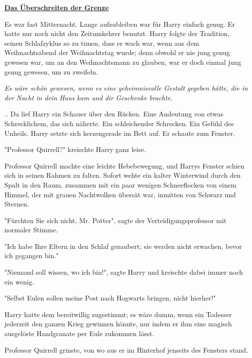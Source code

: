 

\hypertarget{das-uxfcberschreiten-der-grenze}{%

\textbf{\uline{Das Überschreiten der Grenze}}

Es war fast Mitternacht. Lange aufzubleiben war für Harry einfach genug. Er hatte nur noch nicht den Zeitumkehrer benutzt. Harry folgte der Tradition, seinen Schlafzyklus so zu timen, dass er wach war, wenn aus dem Weihnachtsabend der Weihnachtstag wurde; denn obwohl er nie jung genug gewesen war, um an den Weihnachtsmann zu glauben, war er doch einmal jung genug gewesen, um zu zweifeln.

\emph{Es wäre schön gewesen, wenn es eine geheimnisvolle Gestalt gegeben hätte, die in der Nacht in dein Haus kam und dir Geschenke brachte.}

.. Da lief Harry ein Schauer über den Rücken. Eine Andeutung von etwas Schrecklichem, das sich näherte. Ein schleichender Schrecken. Ein Gefühl des Unheils. Harry setzte sich kerzengerade im Bett auf. Er schaute zum Fenster.

"Professor Quirrell?" kreischte Harry ganz leise.

Professor Quirrell machte eine leichte Hebebewegung, und Harrys Fenster schien sich in seinen Rahmen zu falten. Sofort wehte ein kalter Winterwind durch den Spalt in den Raum, zusammen mit ein paar wenigen Schneeflocken von einem Himmel, der mit grauen Nachtwolken übersät war, inmitten von Schwarz und Sternen.

"Fürchten Sie sich nicht, Mr. Potter", sagte der Verteidigungsprofessor mit normaler Stimme.

"Ich habe Ihre Eltern in den Schlaf gezaubert; sie werden nicht erwachen, bevor ich gegangen bin."

"Niemand soll wissen, wo ich bin!", sagte Harry und kreischte dabei immer noch ein wenig.

"Selbst Eulen sollen meine Post nach Hogwarts bringen, nicht hierher!"

Harry hatte dem bereitwillig zugestimmt; es wäre dumm, wenn ein Todesser jederzeit den ganzen Krieg gewinnen könnte, nur indem er ihm eine magisch ausgelöste Handgranate per Eule zukommen lässt.

Professor Quirrell grinste, von wo aus er im Hinterhof jenseits des Fensters stand.

}
